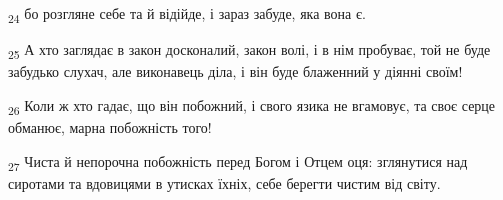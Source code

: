 \begin{tcolorbox}
\textsubscript{24} бо розгляне себе та й відійде, і зараз забуде, яка вона є.
\end{tcolorbox}
\begin{tcolorbox}
\textsubscript{25} А хто заглядає в закон досконалий, закон волі, і в нім пробуває, той не буде забудько слухач, але виконавець діла, і він буде блаженний у діянні своїм!
\end{tcolorbox}
\begin{tcolorbox}
\textsubscript{26} Коли ж хто гадає, що він побожний, і свого язика не вгамовує, та своє серце обманює, марна побожність того!
\end{tcolorbox}
\begin{tcolorbox}
\textsubscript{27} Чиста й непорочна побожність перед Богом і Отцем оця: зглянутися над сиротами та вдовицями в утисках їхніх, себе берегти чистим від світу.
\end{tcolorbox}
